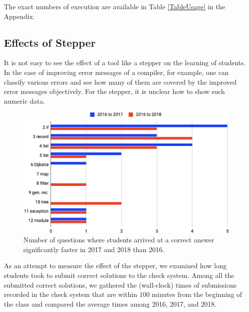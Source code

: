 The exact numbers of execution are available in Table \ref{TableUsage} in the Appendix.

\subsection{Effects of Stepper}
It is not easy to see the effect of a tool like a stepper on
the learning of students.
In the case of improving error messages of a compiler, for example,
one can classify various errors and see how many of them are covered
by the improved error messages objectively.
For the stepper, it is unclear how to show such numeric data.

\begin{figure}
  \begin{center}
    \includegraphics[width=15cm]{6/table2.eps}
    \caption{Number of questions where students arrived at a correct answer significantly faster in 2017 and 2018 than 2016.}
    \label{figure:p}
  \end{center}
\end{figure}

As an attempt to measure the effect of the stepper, we examined how
long students took to submit correct solutions to the check system.
Among all the submitted correct solutions, we gathered the (wall-clock) times of
submissions recorded in the check system that are within 100 minutes
from the beginning of the class and compared the average times among
2016, 2017, and 2018.

